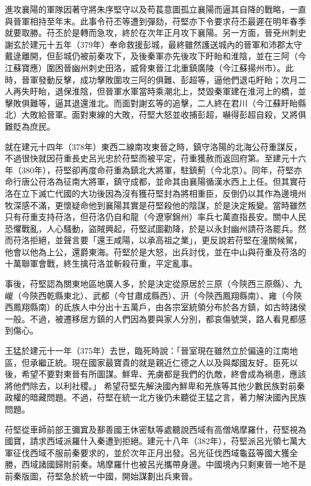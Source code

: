 進攻襄陽的軍隊因著守將朱序堅守以及苟萇意圖孤立襄陽而逼其自降的戰略，一直與晉軍相持至年末。此事令苻丕等遭到彈劾，苻堅亦下令要求苻丕最遲在明年春季就要取勝。苻丕於是轉而急攻，終於在次年正月攻下襄陽。另一方面，晉兗州刺史謝玄於建元十五年（379年）奉命救援彭城，最終雖然護送城內的晉軍和沛郡太守戴逯離開，但彭城仍被前秦攻下，及後秦軍亦先後攻下盱眙和淮陰，並在三阿（今江蘇寶應）圍困晉幽州刺史田洛，威脅東晉江北重鎮廣陵（今江蘇揚州市）。此時，晉軍發動反擊，成功擊敗圍攻三阿的俱難、彭超等，逼他們退屯盱眙；次月二人再失盱眙，退保淮陰，但晉軍水軍當時乘潮北上，焚毀秦軍建在淮河上的橋，並擊敗俱難等，逼其退還淮北。而面對謝玄等的追擊，二人終在君川（今江蘇盱眙縣北）大敗給晉軍。面對東線的大敗，苻堅大怒並收捕彭超，嚇得彭超自殺，又將俱難貶為庶民。

就在建元十四年（378年）東西二線南攻東晉之時，鎮守洛陽的北海公苻重謀反，不過很快就因苻重長史呂光忠於苻堅而被平定，苻重獲赦而返回府第。至建元十六年（380年），苻堅卻再度命苻重為鎮北大將軍，駐鎮薊（今北京）。同年，苻堅亦命行唐公苻洛為征南大將軍，鎮守成都，並命其由襄陽循漢水西上上任。但其實苻洛在立下滅亡代國的大功後因為沒有獲苻堅封為將相重臣，反倒仍以其作為邊境州牧深感不滿，更懷疑命他到襄陽其實是苻堅殺他的陰謀，於是決定叛變。當時雖然只有苻重支持苻洛，但苻洛仍自和龍（今遼寧錦州）率兵七萬直指長安。關中人民恐懼戰亂，人心騷動，盜賊興起，苻堅試圖勸降，於是以永封幽州請苻洛罷兵。然而苻洛拒絕，並聲言要「還王咸陽，以承高祖之業」，更反說若苻堅在潼關候駕，他會以他為上公，還爵東海。苻堅於是大怒，出兵討伐，並在中山與苻重及苻洛的十萬聯軍會戰，終生擒苻洛並斬殺苻重，平定亂事。

事後，苻堅認為關東地區地廣人多，於是決定從原居於三原（今陝西三原縣）、九嵕（今陝西乾縣東北）、武都（今甘肅成縣西）、汧（今陝西鳳翔縣南）、雍（今陝西鳳翔縣南）的氐族人中分出十五萬戶，由各宗室統領分布於各方鎮，如古時諸侯一般。不過，被遷移居方鎮的人們因為要與家人分別，都哀傷號哭，路人看見都感到傷心。

王猛於建元十一年（375年）去世，臨死時說：「晉室現在雖然立於偏遠的江南地區，但承繼正統。現在國家最寶貴的就是親近仁德之人以及與鄰國友好。臣死以後，希望不要對東晉有所圖謀。鮮卑、羌虜都是我們的仇敵，終會成為禍患，應該將他們除去，以利社稷。」 希望苻堅先解決國內鮮卑和羌族等其他少數民族對前秦政權的暗藏問題。不過，苻堅在統一北方後仍未聽從王猛之言，著力解決國內民族問題。

苻堅從車師前部王彌窴及鄯善國王休密馱等處聽說西域有高僧鳩摩羅什，苻堅視為國寶，請求西域派羅什入秦遭到拒絕。建元十八年（382年），苻堅派呂光領七萬大軍征伐西域不服前秦要求的，並於次年正月出發。呂光征伐西域龜茲等國大獲全勝，西域諸國歸附前秦。鳩摩羅什也被呂光攜帶身邊。中國境內只剩東晉一地不是前秦版圖，苻堅急於統一中國，開始謀劃出兵東晉。

